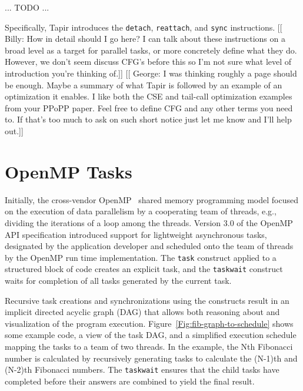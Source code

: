 \documentclass[sigconf]{acmart}
\newcommand{\wmnote}[1]{{\scriptsize \color{red} [[ Billy: #1]]}}
\newcommand{\gsnote}[1]{{\scriptsize \color{blue} [[ George: #1]]}}
\begin{document}
... TODO ...


Specifically, Tapir introduces the \texttt{detach}, \texttt{reattach}, and
\texttt{sync} instructions. \wmnote{How in detail should I go here? I can talk
about these instructions on a broad level as a target for parallel tasks, or
more concretely define what they do. However, we don't seem discuss CFG's
before this so I'm not sure what level of introduction you're thinking of.}
\gsnote{I was thinking roughly a page should be enough. Maybe a summary of what
Tapir is followed by an example of an optimization it enables. I like both the
CSE and tail-call optimization examples from your PPoPP paper. Feel free to 
define CFG and any other terms you need to. If that's too much to ask on such 
short notice just let me know and I'll help out.}

\section{OpenMP Tasks} \label{Sec:OpenMP}

Initially, the cross-vendor OpenMP~\cite{spec} shared memory programming model 
focused on the execution of data parallelism by a cooperating team of threads, 
e.g., dividing the iterations of a loop among the threads. Version 3.0 of the 
OpenMP API specification introduced support for lightweight asynchronous tasks, 
designated by the application developer and scheduled onto the team of threads 
by the OpenMP run time implementation.  The \texttt{task} construct applied to 
a structured block of code creates an explicit task, and the \texttt{taskwait} 
construct waits for completion of all tasks generated by the current task.

Recursive task creations and synchronizations using the constructs result in 
an implicit directed acyclic graph (DAG) that allows both reasoning about and 
visualization of the program execution.  Figure~\ref{Fig:fib-graph-to-schedule}
shows some example code, a view of the task DAG, and a simplified execution 
schedule mapping the tasks to a team of two threads.  In the example, the Nth 
Fibonacci number is calculated by recursively generating tasks to calculate 
the (N-1)th and (N-2)th Fibonacci numbers.  The \texttt{taskwait} ensures that 
the child tasks have completed before their answers are combined to yield the 
final result.
\end{document}
